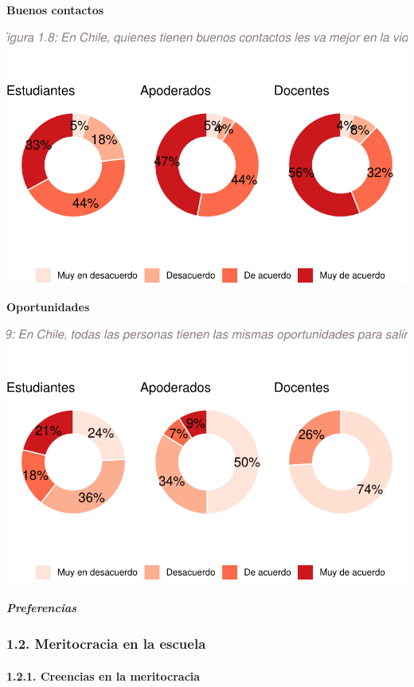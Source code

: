 \documentclass[
  letterpaper,
  DIV=11,
  numbers=noendperiod]{scrartcl}
\let\oldparagraph\paragraph
\renewcommand{\paragraph}[1]{\oldparagraph{#1}\mbox{}}
\let\oldsubparagraph\subparagraph
\renewcommand{\subparagraph}[1]{\oldsubparagraph{#1}\mbox{}}
\begin{document}
\textbf{Buenos contactos}

\includegraphics{doc-colegios-con-profes-y-apoderados_files/figure-pdf/unnamed-chunk-19-1.pdf}

\textbf{Oportunidades}

\includegraphics{doc-colegios-con-profes-y-apoderados_files/figure-pdf/unnamed-chunk-21-1.pdf}

\subparagraph{Preferencias}\label{preferencias}

\subsubsection{1.2. Meritocracia en la
escuela}\label{meritocracia-en-la-escuela}

\paragraph{1.2.1. Creencias en la
meritocracia}\label{creencias-en-la-meritocracia-1}
\end{document}
